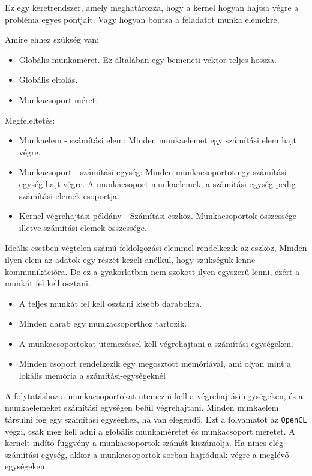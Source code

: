 Ez egy keretrendszer, amely meghatározza, hogy a kernel hogyan hajtsa végre a probléma egyes pontjait. Vagy hogyan bontsa a feladatot munka elemekre.

Amire ehhez szükség van:
\begin{itemize}
\item Globális munkaméret. Ez általában egy bemeneti vektor teljes hossza.
\item Globális eltolás.
\item Munkacsoport méret.
\end{itemize}
Megfeleltetés:
\begin{itemize}
\item Munkaelem - számítási elem: Minden munkaelemet egy számítási elem hajt végre.
\item Munkacsoport - számítási egység: Minden munkacsoportot egy számítási egység hajt végre. A munkacsoport munkaelemek, a számítási egység pedig számítási elemek csoportja.
\item Kernel végrehajtási példány - Számítási eszköz. Munkacsoportok összessége illetve számítási elemek összessége. 
\end{itemize}


Ideális esetben végtelen számú feldolgozási elemmel rendelkezik az eszköz, Minden ilyen elem az adatok egy részét kezeli anélkül, hogy szükségük lenne kommunikációra. De ez a gyakorlatban nem szokott ilyen egyszerű lenni, ezért a munkát fel kell osztani.
\begin{itemize}
\item A teljes munkát fel kell osztani kisebb darabokra.
\item Minden darab egy munkacsoporthoz tartozik.
\item A munkacsoportokat ütemezéssel kell végrehajtani a számítási egységeken.
\item Minden csoport rendelkezik egy megosztott memóriával, ami olyan mint a lokális memória a számítási-egységeknél
\end{itemize}
A folytatáshoz a munkacsoportokat ütemezni kell a végrehajtási egységeken, és a munkaelemeket számítási egységen belül végrehajtani.
Minden munkaelem társulni fog egy számítási egységhez, ha van elegendő. Ezt a folyamatot az \texttt{OpenCL} végzi, csak meg kell adni a globális munkaméretet és munkacsoport méretet. A kernelt indító függvény a  munkacsoportok számát kiszámolja. Ha nincs elég számítási egység, akkor a munkacsoportok sorban hajtódnak végre a meglévő egységeken.

